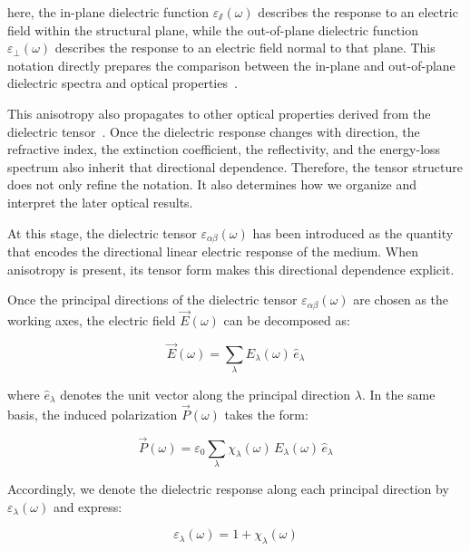 here, the in-plane dielectric function $\varepsilon_{\varparallel}(\omega)$ describes the response to an electric field within the structural plane,
while the out-of-plane dielectric function $\varepsilon_{\perp}(\omega)$ describes the response to an electric field normal to that plane.
This notation directly prepares the comparison between the in-plane and out-of-plane dielectric spectra and optical properties~\cite{guo2021complete,slavich2024exploring}.

This anisotropy also propagates to other optical properties derived from the dielectric tensor~\cite{sujith2023large,slavich2024exploring}.
Once the dielectric response changes with direction, the refractive index, the extinction coefficient, the reflectivity, and the energy-loss spectrum also inherit that directional dependence.
Therefore, the tensor structure does not only refine the notation.
It also determines how we organize and interpret the later optical results.

At this stage, the dielectric tensor $\varepsilon_{\alpha\beta}(\omega)$ has been introduced as the quantity that encodes the directional linear electric response of the medium.
When anisotropy is present, its tensor form makes this directional dependence explicit.

Once the principal directions of the dielectric tensor $\varepsilon_{\alpha\beta}(\omega)$ are chosen as the working axes, the electric field $\vec{E}(\omega)$ can be decomposed as:

\begin{equation}
    \vec{E}(\omega)=\sum_{\lambda}E_{\lambda}(\omega)\,\hat{e}_{\lambda}
\label{electric_field_decomposition_principal_directions}
\end{equation}

where $\hat{e}_{\lambda}$ denotes the unit vector along the principal direction $\lambda$.
In the same basis, the induced polarization $\vec{P}(\omega)$ takes the form:

\begin{equation}
    \vec{P}(\omega)=\varepsilon_0\sum_{\lambda}\chi_{\lambda}(\omega)\,E_{\lambda}(\omega)\,\hat{e}_{\lambda}
\label{polarization_decomposition_principal_directions}
\end{equation}

Accordingly, we denote the dielectric response along each principal direction by $\varepsilon_{\lambda}(\omega)$ and express:

\begin{equation}
    \varepsilon_{\lambda}(\omega)=1+\chi_{\lambda}(\omega)
\label{direction_resolved_dielectric_response}
\end{equation}

